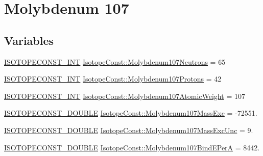 \hypertarget{group___isotope_const-_molybdenum-_mo107}{}\section{Molybdenum 107}
\label{group___isotope_const-_molybdenum-_mo107}
\subsection*{Variables}
\begin{DoxyCompactItemize}
\item 
\mbox{\hyperlink{group___isotope_const-_macros_ga5f18360b3e99483a35c32d789e62621c}{I\+S\+O\+T\+O\+P\+E\+C\+O\+N\+S\+T\+\_\+\+I\+NT}} \mbox{\hyperlink{group___isotope_const-_molybdenum-_mo107_gaa3414f67879a91f57370b0a7df076894}{Isotope\+Const\+::\+Molybdenum107\+Neutrons}} = 65
\item 
\mbox{\hyperlink{group___isotope_const-_macros_ga5f18360b3e99483a35c32d789e62621c}{I\+S\+O\+T\+O\+P\+E\+C\+O\+N\+S\+T\+\_\+\+I\+NT}} \mbox{\hyperlink{group___isotope_const-_molybdenum-_mo107_ga1947354d594984c3bb7ee34d94d8aad6}{Isotope\+Const\+::\+Molybdenum107\+Protons}} = 42
\item 
\mbox{\hyperlink{group___isotope_const-_macros_ga5f18360b3e99483a35c32d789e62621c}{I\+S\+O\+T\+O\+P\+E\+C\+O\+N\+S\+T\+\_\+\+I\+NT}} \mbox{\hyperlink{group___isotope_const-_molybdenum-_mo107_ga393f2b1ff57a905c9c99e8d5ec7e588d}{Isotope\+Const\+::\+Molybdenum107\+Atomic\+Weight}} = 107
\item 
\mbox{\hyperlink{group___isotope_const-_macros_ga8f45a7272ce02c0b4c65c44636ed719a}{I\+S\+O\+T\+O\+P\+E\+C\+O\+N\+S\+T\+\_\+\+D\+O\+U\+B\+LE}} \mbox{\hyperlink{group___isotope_const-_molybdenum-_mo107_ga0563f92515ff66e4d522d8627c73a3a8}{Isotope\+Const\+::\+Molybdenum107\+Mass\+Exc}} = -\/72551.
\item 
\mbox{\hyperlink{group___isotope_const-_macros_ga8f45a7272ce02c0b4c65c44636ed719a}{I\+S\+O\+T\+O\+P\+E\+C\+O\+N\+S\+T\+\_\+\+D\+O\+U\+B\+LE}} \mbox{\hyperlink{group___isotope_const-_molybdenum-_mo107_ga4f61c92e63e5756a5a1b2389e9ba7045}{Isotope\+Const\+::\+Molybdenum107\+Mass\+Exc\+Unc}} = 9.
\item 
\mbox{\hyperlink{group___isotope_const-_macros_ga8f45a7272ce02c0b4c65c44636ed719a}{I\+S\+O\+T\+O\+P\+E\+C\+O\+N\+S\+T\+\_\+\+D\+O\+U\+B\+LE}} \mbox{\hyperlink{group___isotope_const-_molybdenum-_mo107_ga7ba781d1c69fd5d39a83ab7e49e68bdd}{Isotope\+Const\+::\+Molybdenum107\+Bind\+E\+PerA}} = 8442.
\item 

\end{DoxyCompactItemize}
